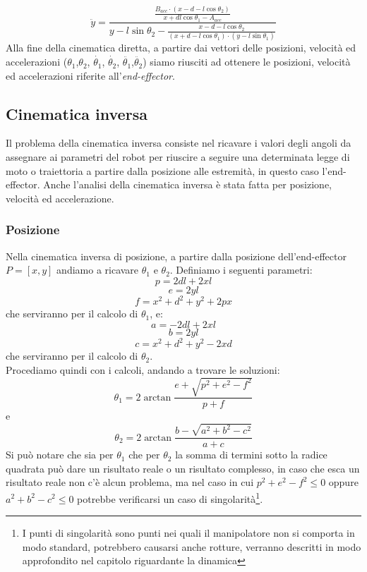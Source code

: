 \begin{equation}
     \ddot{y} = \frac{\frac{B_{acc}\cdot(x-d-l\cos\theta_2)}{x+dl\cos\theta_1-A_{acc}}}{y-l\sin\theta_2-\frac{x-d-l\cos\theta_2}{(x+d-l\cos\theta_1)\cdot(y-l\sin\theta_1)}}
\end{equation}
Alla fine della cinematica diretta, a partire dai vettori delle posizioni, velocità ed accelerazioni ($\theta_1$,$\theta_2$, $\dot{\theta_1}$, $\dot{\theta_2}$, $\ddot{\theta_1}$,$\ddot{\theta_2}$) siamo riusciti ad ottenere le posizioni, velocità ed accelerazioni riferite all'\textit{end-effector}.
\subsection{Cinematica inversa}
Il problema della cinematica inversa consiste nel ricavare i valori degli angoli da assegnare ai parametri del robot per riuscire a seguire una determinata legge di moto o traiettoria a partire dalla posizione alle estremità, in questo caso l'end-effector. Anche l'analisi della cinematica inversa è stata fatta per posizione, velocità ed accelerazione.
\subsubsection{Posizione}
Nella cinematica inversa di posizione, a partire dalla posizione dell'end-effector $P = [x,y]$ andiamo a ricavare $\theta_1$ e $\theta_2$. Definiamo i seguenti parametri:
\begin{equation*}
    p = 2dl + 2xl
\end{equation*}
\begin{equation*}
	e = 2yl
\end{equation*}
\begin{equation*}
	f = x^2+d^2+y^2+2px
\end{equation*}
che serviranno per il calcolo di $\theta_1$, e:
\begin{equation*}
 a = -2dl+2xl
\end{equation*}
\begin{equation*}
	b = 2yl
\end{equation*}
\begin{equation*}
	c = x^2+d^2+y^2-2xd
\end{equation*}
che serviranno per il calcolo di $\theta_2$. 
\\Procediamo quindi con i calcoli, andando a trovare le soluzioni: 
\begin{equation}
    \theta_1 = 2\arctan\frac{e+\sqrt{p^2+e^2-f^2}}{p+f}
\end{equation}
e
\begin{equation}
    \theta_2 = 2\arctan\frac{b-\sqrt{a^2+b^2-c^2}}{a+c}
\end{equation}
Si può notare che sia per $\theta_1$ che per $\theta_2$ la somma di termini sotto la radice quadrata può dare un risultato reale o un risultato complesso, in caso che esca un risultato reale non c'è alcun problema, ma nel caso in cui $p^2 + e^2 -f^2 \le 0$ oppure $a^2 + b^2 -c^2 \le 0$ potrebbe verificarsi un caso di singolarità\footnote{I punti di singolarità sono punti nei quali il manipolatore non si comporta in modo standard, potrebbero causarsi anche rotture, verranno descritti in modo approfondito nel capitolo riguardante la dinamica}.
